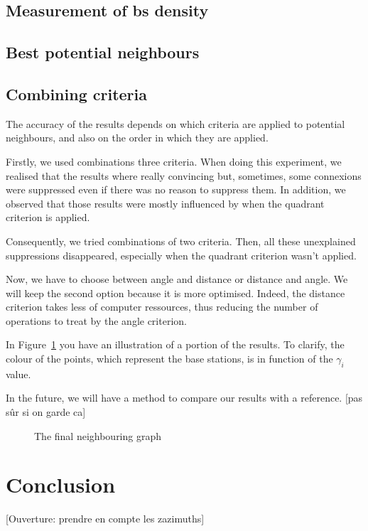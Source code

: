 \documentclass[lettersize,journal,english]{IEEEtran}
\begin{document}
    \subsection{Measurement of \acrshort{bs} density}

    \subsection{Best potential neighbours}
        
    \subsection{Combining criteria}
        The accuracy of the results depends on which criteria are applied to potential neighbours, and also on the order in which they are applied.

        Firstly, we used combinations three criteria. When doing this experiment, we realised that the results where really convincing but, sometimes, some connexions were suppressed even if there was no reason to suppress them. In addition, we observed that those results were mostly influenced by when the quadrant criterion is applied.

        Consequently, we tried combinations of two criteria. Then, all these unexplained suppressions disappeared, especially when the quadrant criterion wasn't applied.

        Now, we have to choose between angle and distance or distance and angle. We will keep the second option because it is more optimised. Indeed, the distance criterion takes less of computer ressources, thus reducing the number of operations to treat by the angle criterion.

        In Figure~\ref{fig:final_neighs} you have an illustration of a portion of the results. To clarify, the colour of the points, which represent the base stations, is in function of the $\gamma_i$ value.

        In the future, we will have a method to compare our results with a reference. [pas sûr si on garde ca]
        \begin{figure}
            \centering
            \caption{The final neighbouring graph}
            \label{fig:final_neighs}
        \end{figure}

\section{Conclusion\label{sec:ccl}}
    [Ouverture: prendre en compte les zazimuths]

\printglossary[type=\acronymtype]
\printglossary



\end{document}
